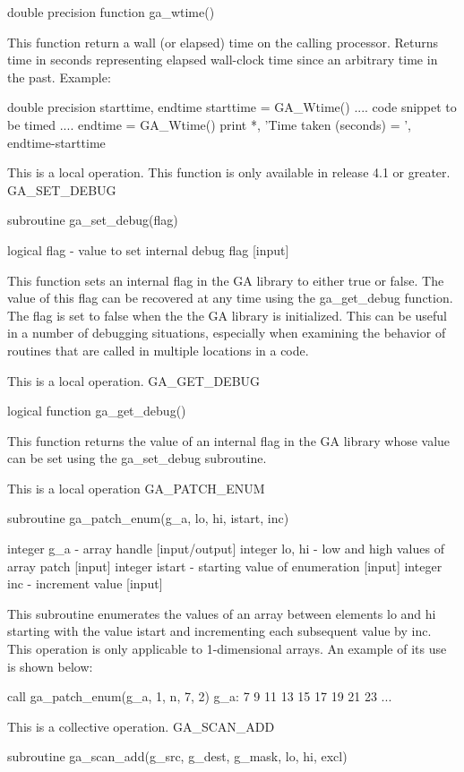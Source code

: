 double precision function ga\_wtime()

This function return a wall (or elapsed) time on the calling processor.
Returns time in seconds representing elapsed wall-clock time since
an arbitrary time in the past. Example:

double precision starttime, endtime starttime = GA\_Wtime() .... code
snippet to be timed .... endtime = GA\_Wtime() print {*}, 'Time taken
(seconds) = ', endtime-starttime

This is a local operation. This function is only available in release
4.1 or greater. GA\_SET\_DEBUG

subroutine ga\_set\_debug(flag)

logical flag - value to set internal debug flag {[}input{]}

This function sets an internal flag in the GA library to either true
or false. The value of this flag can be recovered at any time using
the ga\_get\_debug function. The flag is set to false when the the
GA library is initialized. This can be useful in a number of debugging
situations, especially when examining the behavior of routines that
are called in multiple locations in a code.

This is a local operation. GA\_GET\_DEBUG

logical function ga\_get\_debug()

This function returns the value of an internal flag in the GA library
whose value can be set using the ga\_set\_debug subroutine.

This is a local operation GA\_PATCH\_ENUM

subroutine ga\_patch\_enum(g\_a, lo, hi, istart, inc)

integer g\_a - array handle {[}input/output{]} integer lo, hi - low
and high values of array patch {[}input{]} integer istart - starting
value of enumeration {[}input{]} integer inc - increment value {[}input{]}

This subroutine enumerates the values of an array between elements
lo and hi starting with the value istart and incrementing each subsequent
value by inc. This operation is only applicable to 1-dimensional arrays.
An example of its use is shown below:

call ga\_patch\_enum(g\_a, 1, n, 7, 2) g\_a: 7 9 11 13 15 17 19 21
23 ...

This is a collective operation. GA\_SCAN\_ADD

subroutine ga\_scan\_add(g\_src, g\_dest, g\_mask, lo, hi, excl)

